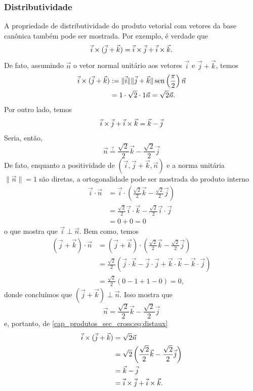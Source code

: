 \subsubsection{Distributividade}

A propriedade de distributividade do produto vetorial com vetores da base canônica também pode ser mostrada. Por exemplo, é verdade que
\begin{equation}\label{cap_produtos_sec_cross:eq:distijk}
  \vec{i}\times(\vec{j}+\vec{k}) = \vec{i}\times\vec{j}+\vec{i}\times\vec{k}.
\end{equation}
De fato, assumindo $\vec{n}$ o vetor normal unitário aos vetores $\vec{i}$ e $\vec{j}+\vec{k}$, temos
\begin{align}
  \vec{i}\times(\vec{j}+\vec{k}) &:= \|\vec{i}\|\|\vec{j}+\vec{k}\|\operatorname{sen}\left(\frac{\pi}{2}\right)\vec{n}\\
                                 &= 1\cdot \sqrt{2}\cdot 1\vec{n} = \sqrt{2}\vec{n}.\label{cap_produtos_sec_cross:eq:distaux}
\end{align}
Por outro lado, temos
\begin{align}
  \vec{i}\times\vec{j} + \vec{i}\times\vec{k} = \vec{k} - \vec{j}
\end{align}
Seria, então,
\begin{equation}
  \vec{n} \stackrel{?}{=} \frac{\sqrt{2}}{2}\vec{k} - \frac{\sqrt{2}}{2}\vec{j}
\end{equation}
De fato, enquanto a positividade de $(\vec{i}, \vec{j}+\vec{k}, \vec{n})$ e a norma unitária $\|\vec{n}\|=1$ são diretas, a ortogonalidade pode ser mostrada do produto interno
\begin{align}
  \vec{i}\cdot\vec{n} &= \vec{i}\cdot\left(\frac{\sqrt{2}}{2}\vec{k} - \frac{\sqrt{2}}{2}\vec{j}\right)\\
  &= \frac{\sqrt{2}}{2}\vec{i}\cdot\vec{k} - \frac{\sqrt{2}}{2}\vec{i}\cdot\vec{j}\\
  &= 0 + 0 = 0
\end{align}
o que mostra que $\vec{i}\perp\vec{n}$. Bem como, temos
\begin{align}
  \left(\vec{j}+\vec{k}\right)\cdot\vec{n} &= \left(\vec{j}+\vec{k}\right)\cdot\left(\frac{\sqrt{2}}{2}\vec{k} - \frac{\sqrt{2}}{2}\vec{j}\right)\\
  &= \frac{\sqrt{2}}{2}\left(\vec{j}\cdot\vec{k}-\vec{j}\cdot\vec{j}+\vec{k}\cdot\vec{k}-\vec{k}\cdot\vec{j}\right)\\
  &= \frac{\sqrt{2}}{2}(0-1+1-0) = 0,
\end{align}
donde concluímos que $(\vec{j}+\vec{k})\perp\vec{n}$. Isso mostra que
\begin{equation}
  \vec{n} = \frac{\sqrt{2}}{2}\vec{k} - \frac{\sqrt{2}}{2}\vec{j}
\end{equation}
e, portanto, de \eqref{cap_produtos_sec_cross:eq:distaux}
\begin{align}
  \vec{i}\times(\vec{j}+\vec{k}) &= \sqrt{2}\vec{n}\\
  &= \sqrt{2}\left(\frac{\sqrt{2}}{2}\vec{k} - \frac{\sqrt{2}}{2}\vec{j}\right)\\
  &= \vec{k} - \vec{j}\\
  &= \vec{i}\times\vec{j} + \vec{i}\times\vec{k}.
\end{align}

